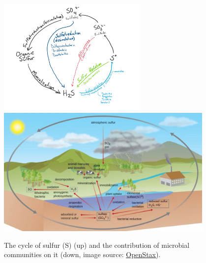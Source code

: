    \begin{figure}[h]
      \centering
      \includegraphics[width=0.65\textwidth]{figures/Sulfur_Cycle_for_Hydrothermal_Vents.png}
      \includegraphics[width=0.95\textwidth]{figures/sulfur_village.png}
      \caption[The cycle of S and the role of microbial communiites]{
         The cycle of sulfur (S) (up) and the contribution of microbial communities on it (down, image source: \href{https://openstax.org/resources/3002d0fba25221d24455917117482a079a11f321}{OpenStax}).
      }
      \label{fig:co2}
   \end{figure}

